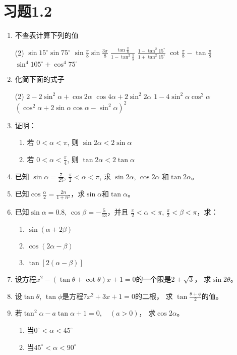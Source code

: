 \section*{习题1.2}
\begin{enumerate}
    \item 不查表计算下列的值
\begin{tasks}(2)
    \task $\sin 15^{\circ} \sin 75^{\circ}$
    \task $\sin \frac{\pi}{8} \sin \frac{3 \pi}{8}$
    \task $\frac{\tan\frac{\pi}{8}}{1-\tan^2\frac{\pi}{8}}$
    \task $\frac{1-\tan^2 15^{\circ}}{1+\tan^2 15^{\circ}}$
    \task $\cot\frac{\pi}{8}-\tan\frac{\pi}{8}$
    \task $\sin^{4} 105^{\circ}+\cos^{4} 75^{\circ}$
\end{tasks}

\item 化简下面的式子
\begin{tasks}(2)
\task  $2-2 \sin ^{2} \alpha+\cos 2 \alpha$
\task  $\cos 4 \alpha+2 \sin ^{2} 2 \alpha$
\task $1-4 \sin ^{2} \alpha \cos ^{2} \alpha$
\task $\left(\cos ^{2} \alpha+2 \sin \alpha \cos \alpha-\sin ^{2} \alpha\right)^{2}$
\end{tasks}

\item 证明：
\begin{enumerate}
    \item 若 $0<\alpha<\pi$, 则 $\sin 2 \alpha<2 \sin \alpha$
    \item 若 $0<\alpha<\frac{\pi}{4}$, 则 $\tan 2 \alpha<2\tan  \alpha$
\end{enumerate}

\item  已知 $\sin \alpha=\frac{7}{25}$, $\frac{\pi}{2}<\alpha<\pi$,
求 $\sin 2 \alpha$, $\cos 2 \alpha$ 和$\tan 2 \alpha$。

\item 已知$\cos\frac{\alpha}{2}=\frac{2n}{1+n^2}$，求$\sin\alpha$和$\tan\alpha$。
\item 已知$\sin\alpha=0.8$, $\cos\beta=-\frac{5}{13}$，并且
$\frac{\pi}{2}<\alpha<\pi$, $\frac{\pi}{2}<\beta<\pi$，求：
\begin{enumerate}
    \item $\sin(\alpha+2\beta)$
    \item $\cos(2\alpha-\beta)$
    \item $\tan[2(\alpha-\beta)]$
\end{enumerate}
\item 设方程$x^2-(\tan \theta+\cot \theta)x+1=0$的一个限是$2+\sqrt{3}$，
求$\sin2\theta$。
\item 设$\tan \theta$, $\tan \phi$是方程$7x^2+3x+1=0$的二根，
求 $\tan\frac{\theta+\phi}{2}$的值。
\item 若$\tan^2 \alpha-a\tan \alpha+1=0,\quad (a>0)$，
求$\cos2\alpha$。
\begin{enumerate}
    \item 当$0^{\circ}<\alpha<45^{\circ}$
    \item 当$45^{\circ}<\alpha<90^{\circ}$
\end{enumerate}


\end{enumerate}
